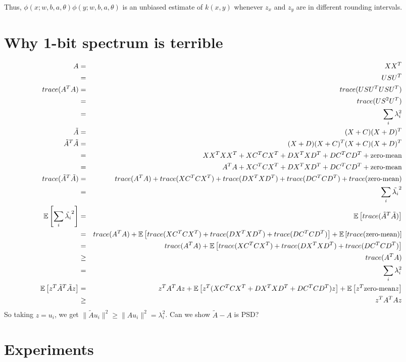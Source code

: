 \documentclass[12pt]{article}
\newcommand{\tA}{\tilde{A}}
\begin{document}
Thus, $\phi(x;w,b,a,\theta)\phi(y;w,b,a,\theta)$ is an unbiased estimate of $k(x,y)$ whenever
$z_x$ and $z_y$ are in different rounding intervals.

\section{Why 1-bit spectrum is terrible}
\begin{eqnarray*}
	A &=& XX^T \\
	&=& USU^T \\ %
	trace(A^T A) &=& trace( USU^T U S U^T)\\
	&=& trace( US^2 U^T) \\
	&=& \sum_i{\lambda_i^2}\\
	\tA &=& (X+C)(X+D)^T \\
	\tA^T\tA &=& (X+D)(X+C)^T(X+C)(X+D)^T \\
	&=& XX^TXX^T + XC^TCX^T + DX^TXD^T + DC^TCD^T + \text{zero-mean}\\ 
	&=& A^TA + XC^TCX^T + DX^TXD^T + DC^TCD^T + \text{zero-mean}\\ 
	trace(\tA^T\tA) &=& trace(A^TA) + trace(XC^TCX^T) + trace(DX^TXD^T) + trace(DC^TCD^T) + trace(\text{zero-mean})\\ 
	&=& \sum_i \tilde{\lambda_i}^2\\
	\expect{}{\sum_i \tilde{\lambda_i}^2} &=& \expect{}{trace(\tA^T\tA)} \\
	&=& trace(A^TA) + \expect{}{trace(XC^TCX^T) + trace(DX^TXD^T) + trace(DC^TCD^T)} + \expect{}{trace(\text{zero-mean})}\\
	&=& trace(A^TA) + \expect{}{trace(XC^TCX^T) + trace(DX^TXD^T) + trace(DC^TCD^T)}\\	
	&\geq& trace(A^TA) \\
	&=&  \sum_i{\lambda_i^2} \\
	\expect{}{z^T \tA^T\tA z} &=& z^TA^TAz + \expect{}{z^T(XC^TCX^T + DX^TXD^T + DC^TCD^T)z} + \expect{}{z^T\text{zero-mean}z}\\ 
	&\geq& z^TA^TAz 
\end{eqnarray*}
So taking $z = u_i$, we get $\|\tA u_i\|^2 \geq \|Au_i\|^2 = \lambda_i^2$.
Can we show $\tA-A$ is PSD?

\section{Experiments}
\end{document}
